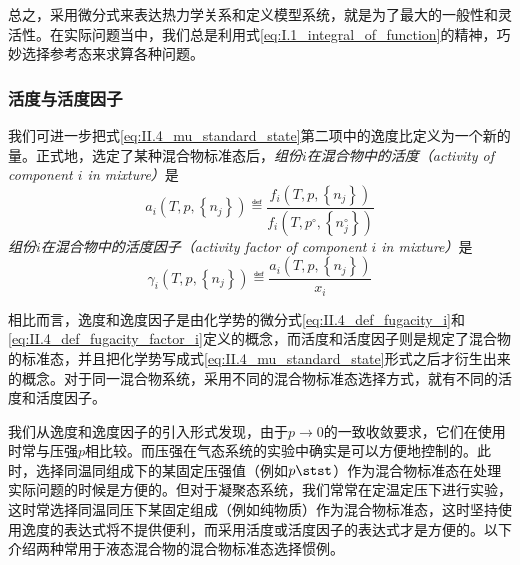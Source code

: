 \documentclass[main.tex]{subfiles}
\begin{document}
总之，采用微分式来表达热力学关系和定义模型系统，就是为了最大的一般性和灵活性。在实际问题当中，我们总是利用式\eqref{eq:I.1_integral_of_function}的精神，巧妙选择参考态来求算各种问题。

\subsubsection{活度与活度因子}
我们可进一步把式\eqref{eq:II.4_mu_standard_state}第二项中的逸度比定义为一个新的量。正式地，选定了某种混合物标准态后，\emph{组份$i$在混合物中的活度（activity of component $i$ in mixture）}是
\begin{equation}
  a_i\left(T,p,\left\{n_j\right\}\right)\eqdef\frac{f_i\left(T,p,\left\{n_j\right\}\right)}{f_i\left(T,p^\circ,\left\{n_j^\circ\right\}\right)}
\end{equation}
\emph{组份$i$在混合物中的活度因子（activity factor of component $i$ in mixture）}是
\begin{equation}
  \gamma_i\left(T,p,\left\{n_j\right\}\right)\eqdef\frac{a_i\left(T,p,\left\{n_j\right\}\right)}{x_i}
\end{equation}

相比而言，逸度和逸度因子是由化学势的微分式\eqref{eq:II.4_def_fugacity_i}和\eqref{eq:II.4_def_fugacity_factor_i}定义的概念，而活度和活度因子则是规定了混合物的标准态，并且把化学势写成式\eqref{eq:II.4_mu_standard_state}形式之后才衍生出来的概念。对于同一混合物系统，采用不同的混合物标准态选择方式，就有不同的活度和活度因子。

我们从逸度和逸度因子的引入形式发现，由于$p\rightarrow 0$的一致收敛要求，它们在使用时常与压强$p$相比较。而压强在气态系统的实验中确实是可以方便地控制的。此时，选择同温同组成下的某固定压强值（例如$p\stst$）作为混合物标准态在处理实际问题的时候是方便的。但对于凝聚态系统，我们常常在定温定压下进行实验，这时常选择同温同压下某固定组成（例如纯物质）作为混合物标准态，这时坚持使用逸度的表达式将不提供便利，而采用活度或活度因子的表达式才是方便的。以下介绍两种常用于液态混合物的混合物标准态选择惯例。
\end{document}
